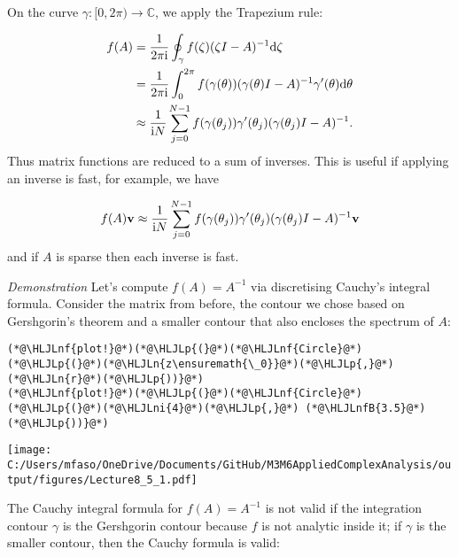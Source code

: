 \documentclass[12pt,a4paper]{article}
\newcommand{\HLJLn}[1]{#1}
\newcommand{\HLJLnf}[1]{\textcolor[RGB]{66,102,213}{#1}}
\newcommand{\HLJLnfB}[1]{\textcolor[RGB]{59,151,46}{#1}}
\newcommand{\HLJLni}[1]{\textcolor[RGB]{59,151,46}{#1}}
\newcommand{\HLJLp}[1]{#1}
\def\D{ {\rm d} }
\def\I{ {\rm i} }
\def\vc#1{ {\mathbf #1} }
\begin{document}
On the curve $\gamma : [0,2 \pi) \rightarrow \mathbb{C}$, we apply the Trapezium rule:


\begin{align*}
f(A) & = {1 \over 2 \pi \I} \oint_\gamma f(\zeta) (\zeta I - A)^{-1} \D \zeta \\
& = {1 \over 2 \pi \I} \int_0^{2\pi}  f(\gamma(\theta)) (\gamma(\theta) I - A)^{-1}\gamma'(\theta)  \D \theta \\
& \approx
{1 \over \I N}  \sum_{j=0}^{N-1} f(\gamma(\theta_j)) \gamma'(\theta_j) (\gamma(\theta_j) I - A)^{-1}.
\end{align*}
Thus matrix functions are reduced to a sum of inverses. This is useful if applying an inverse is fast, for example, we have

\[
f(A) \vc v \approx {1 \over \I N}  \sum_{j=0}^{N-1} f(\gamma(\theta_j)) \gamma'(\theta_j) (\gamma(\theta_j) I - A)^{-1} \vc v
\]
and if $A$ is sparse then each inverse is fast.

\emph{Demonstration} Let's compute $f(A) = A^{-1}$ via discretising Cauchy's integral formula. Consider the matrix from before, the contour we chose based on Gershgorin's theorem and a smaller contour that also encloses the spectrum of $A$:


\begin{lstlisting}
(*@\HLJLnf{plot!}@*)(*@\HLJLp{(}@*)(*@\HLJLnf{Circle}@*)(*@\HLJLp{(}@*)(*@\HLJLn{z\ensuremath{\_0}}@*)(*@\HLJLp{,}@*) (*@\HLJLn{r}@*)(*@\HLJLp{))}@*)
(*@\HLJLnf{plot!}@*)(*@\HLJLp{(}@*)(*@\HLJLnf{Circle}@*)(*@\HLJLp{(}@*)(*@\HLJLni{4}@*)(*@\HLJLp{,}@*) (*@\HLJLnfB{3.5}@*)(*@\HLJLp{))}@*)
\end{lstlisting}

\texttt{[image: C:/Users/mfaso/OneDrive/Documents/GitHub/M3M6AppliedComplexAnalysis/output/figures/Lecture8\_5\_1.pdf]}

The Cauchy integral formula for $f(A) = A^{-1}$ is not valid if the integration contour $\gamma$ is the Gershgorin contour because $f$ is not analytic inside it; if $\gamma$ is the smaller contour, then the Cauchy formula is valid:
\end{document}
